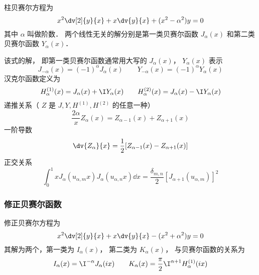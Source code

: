 
柱贝赛尔方程为
\begin{equation}
x^2 \dv[2]{y}{x} + x\dv{y}{x} + (x^2 - \alpha ^2)y = 0
\end{equation}
其中 $\alpha$ 叫做阶数． 两个线性无关的解分别是第一类贝赛尔函数 $J_\alpha(x)$ 和第二类贝赛尔函数 $Y_\alpha(x)$． 

该式的解， 即第一类贝赛尔函数通常用大写的 $J_\alpha(x)$， $Y_\alpha(x)$ 表示
\begin{equation}
J_{-\alpha}(x) = (-1)^\alpha J_\alpha(x)
\qquad
Y_{-\alpha}(x) = (-1)^\alpha Y_\alpha(x)
\end{equation}
汉克尔函数定义为
\begin{equation}
H_\alpha ^{(1)}(x) = J_\alpha(x) + \I Y_\alpha(x)
\qquad
H_\alpha ^{(2)}(x) = J_\alpha(x) - \I Y_\alpha(x)
\end{equation} 
递推关系（ $Z$ 是 $J, Y, H^{(1)}, H^{(2)}$ 的任意一种）
\begin{equation}
\frac{2\alpha}{x} Z_\alpha(x) = Z_{\alpha -1}(x) + Z_{\alpha+1}(x)
\end{equation}
一阶导数
\begin{equation}
\dv{Z_\alpha}{x} = \frac12 [Z_{\alpha  - 1}(x) - Z_{\alpha +1}(x)]
\end{equation}
正交关系
\begin{equation}
\int_0^1 x J_\alpha (u_{\alpha ,m} x) J_\alpha (u_{\alpha ,n} x) \dd{x} = \frac{\delta_{m,n}}{2}[J_{\alpha + 1} (u_{\alpha ,m})]^2
\end{equation}

\subsubsection{修正贝赛尔函数}
修正贝赛尔方程为
\begin{equation}
x^2 \dv[2]{y}{x} + x \dv{y}{x} - (x^2 + \alpha ^2)y = 0
\end{equation}
其解为两个，第一类为 $I_\alpha(x)$，  第二类为 $K_\alpha(x)$，  与贝赛尔函数的关系为
\begin{equation}
I_\alpha(x) = \I^{-\alpha} J_\alpha(ix)
\qquad
K_\alpha(x) = \frac{\pi}{2} \I^{\alpha  + 1} H_\alpha ^{(1)}(ix)
\end{equation}

